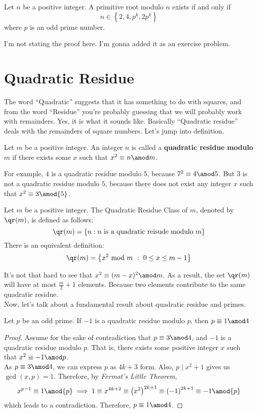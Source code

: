 \documentclass[11pt]{scrartcl}
\begin{document}
\begin{theorem}
Let \(n\) be a positive integer. A primitive root modulo \(n\) exists if and only if
\[n \in \left\{ 2, 4, p^k, 2p^k \right\} \]
where \(p\) is an odd prime number.
\end{theorem}
I'm not stating the proof here. I'm gonna added it as an exercise problem.


\pagebreak
\section{Quadratic Residue}
The word ``Quadratic'' suggests that it has something to do with squares, and from the word ``Residue'' you're probably guessing that we will probably work with remainders. Yes, it is what it sounds like. Basically ``Quadratic residue'' deals with the remainders of square numbers. Let's jump into definition. 
\begin{defn}
Let \(m\) be a positive integer. An integer \(n\) is called a \textbf{quadratic residue modulo \(m\)} if there exists some \(x\) such that \(x^2 \equiv n \amod m\). 
\end{defn}
For example, \(4\) is a quadratic residue modulo \(5\), because \(7^2 \equiv 4 \amod 5\). But \(3\) is not a quadratic residue modulo \(5\), because there does not exist any integer \(x\) such that \(x^2 \equiv 3 \amod{5}\). 
\begin{defn}
Let \(m\) be a positive integer. The Quadratic Residue Class of \(m\), denoted by \(\qr(m)\), is defined as follows:
\[\qr(m) = \left\{ n : n \text{ is a quadratic reisude modulo }m \right\} \]
There is an equivalent definition:
\[\qr(m) = \left\{ x^2 \text{ mod } m \ : \ 0 \leq x \leq m-1 \right\} \]
\end{defn}
It's not that hard to see that \(x^2 \equiv (m-x)^2 \amod m\). As a result, the set \(\qr(m)\) will have at most \(\frac{m}{2}+1\) elements. Because two elements contribute to the same quadratic residue. \\
Now, let's talk about a fundamental result about quadratic residue and primes.
\begin{proposition}
Let \(p\) be an odd prime. If \(-1\) is a quadratic residue modulo \(p\), then \(p \equiv 1 \amod 4\)
\end{proposition}
\begin{proof}
Assume for the sake of contradiction that \(p \equiv 3 \amod 4\), and \(-1\) is a quadratic residue modulo \(p\). That is, there exists some positive integer \(x\) such that \(x^2 \equiv -1 \amod p\). \\
As \(p \equiv 3 \amod 4\), we can express \(p\) as \(4k+3\) form. Also, \(p \mid x^2 + 1\) gives us \(\gcd(x,p)=1\). Therefore, by \textit{Fermat's Little Theorem},
\[x^{p-1} \equiv 1 \amod{p} \implies 1 \equiv x^{4k+2} \equiv \left(x^2\right)^{2k+1} \equiv \left(-1\right)^{2k+1} \equiv -1 \amod{p} \]
which leads to a contradiction. Therefore, \(p \equiv 1 \amod 4\).
\end{proof}
\end{document}
